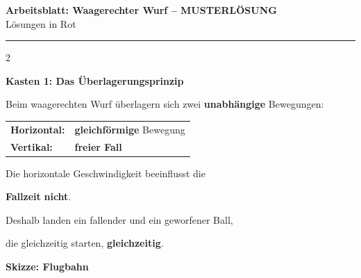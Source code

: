 \documentclass[10pt, a4paper]{article}
\newcommand{\fachfarbe}{physik}
\newcommand{\thema}{Waagerechter Wurf}
\newcommand{\lsg}[1]{\textcolor{loesung}{\textbf{#1}}}
\newcommand{\ph}[1]{\textcolor{\fachfarbe}{\textbf{#1}}}
\newcommand{\abschnitt}[1]{%
    \vspace{8pt}
    \noindent\textbf{\textcolor{\fachfarbe}{#1}}
    \vspace{4pt}
}
\begin{document}

\begin{center}
{\large\bfseries Arbeitsblatt: \thema{} -- \textcolor{loesung}{MUSTERLÖSUNG}}\\[2pt]
{\small\textcolor{grau}{Lösungen in Rot}}
\end{center}

\vspace{-2pt}
\hrule
\vspace{8pt}


\begin{multicols}{2}
\small


\abschnitt{Kasten 1: Das Überlagerungsprinzip}

\begin{merksatz}[Merksatz]
Beim waagerechten Wurf überlagern sich zwei \ph{unabhängige} Bewegungen:

\vspace{6pt}
\begin{tabular}{ll}
\textbf{Horizontal:} & \lsg{gleichförmige} Bewegung \\[4pt]
\textbf{Vertikal:} & \lsg{freier Fall} \\
\end{tabular}

\vspace{8pt}
Die horizontale Geschwindigkeit beeinflusst die

\lsg{Fallzeit} \textbf{nicht}.

\vspace{6pt}
Deshalb landen ein fallender und ein geworfener Ball,

die gleichzeitig starten, \lsg{gleichzeitig}.
\end{merksatz}

\vspace{4pt}


\abschnitt{Skizze: Flugbahn}


\end{multicols}
\end{document}
